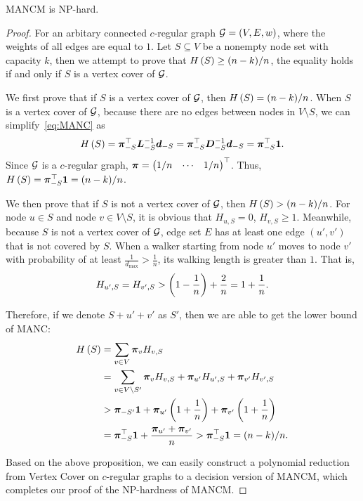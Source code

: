 \documentclass[sigconf]{acmart}
\begin{document}
\begin{theorem}\label{thm:np-hard}
    MANCM is NP-hard.
\end{theorem}
\begin{proof}
    For an arbitary connected \(c\)-regular graph \(\mathcal{G}=(V,E,w)\), where the weights of all edges are equal to \(1\).
    Let \(S\subseteq V\) be a nonempty node set with capacity \(k\), then we attempt to prove that \(H\left(S\right)\ge (n-k)/n\), the equality holds if and only if \(S\) is a vertex cover of \(\mathcal{G}\).

    We first prove that if \(S\) is a vertex cover of \(\mathcal{G}\), then \(H\left(S\right)=(n-k)/n\).
    When \(S\) is a vertex cover of \(\mathcal{G}\), because there are no edges between nodes in \(V\setminus S\), we can simplify~\eqref{eq:MANC} as
    \[H\left(S\right)=\boldsymbol{\pi}_{-S}^\top\boldsymbol{L}_{-S}^{-1}\boldsymbol{d}_{-S}=\boldsymbol{\pi}_{-S}^\top\boldsymbol{D}_{-S}^{-1}\boldsymbol{d}_{-S}=\boldsymbol{\pi}_{-S}^\top\boldsymbol{1}.\]
    Since \(\mathcal{G}\) is a \(c\)-regular graph, \(\boldsymbol{\pi}=\begin{pmatrix}1/n&\cdots&1/n\end{pmatrix}^\top\).
    Thus, \(H\left(S\right)=\boldsymbol{\pi}_{-S}^\top\boldsymbol{1}=(n-k)/n\).

    We then prove that if \(S\) is not a vertex cover of \(\mathcal{G}\), then \(H\left(S\right)>(n-k)/n\).
    For node \(u\in S\) and node \(v\in V\setminus S\), it is obvious that \(H_{u,S}=0\), \(H_{v,S}\ge1\).
    Meanwhile, because \(S\) is not a vertex cover of \(\mathcal{G}\), edge set \(E\) has at least one edge \((u',v')\) that is not covered by \(S\).
    When a walker starting from node \(u'\) moves to node \(v'\) with probability of at least \(\frac{1}{d_{\max}}>\frac{1}{n}\), its walking length is greater than \(1\).
    That is,
    \[H_{u',S}=H_{v',S}>\left( 1-\frac{1}{n} \right)+\frac{2}{n}=1+\frac{1}{n}.\]

    Therefore, if we denote \(S+u'+v'\) as \(S'\), then we are able to get the lower bound of MANC:
    \begin{align*}
        H\left(S\right) & =\sum_{v\in V}\boldsymbol{\pi}_vH_{v,S}                                                          \\
                 & =\sum_{v\in V\setminus S'}\boldsymbol{\pi}_vH_{v,S}+\boldsymbol{\pi}_{u'}H_{u',S}+\boldsymbol{\pi}_{v'}H_{v',S}      \\
                 & >\boldsymbol{\pi}_{-S'}\boldsymbol{1}+\boldsymbol{\pi}_{u'}\left( 1+\frac{1}{n} \right)+\boldsymbol{\pi}_{v'}\left( 1+\frac{1}{n} \right) \\
                 & =\boldsymbol{\pi}_{-S}^\top\boldsymbol{1}+\frac{\boldsymbol{\pi}_{u'}+\boldsymbol{\pi}_{v'}}n
        >\boldsymbol{\pi}_{-S}^\top\boldsymbol{1}=(n-k)/n.
    \end{align*}

    Based on the above proposition, we can easily construct a polynomial reduction from Vertex Cover on \(c\)-regular graphs to a decision version of MANCM, which completes our proof of the NP-hardness of MANCM.

\end{proof}
\end{document}
